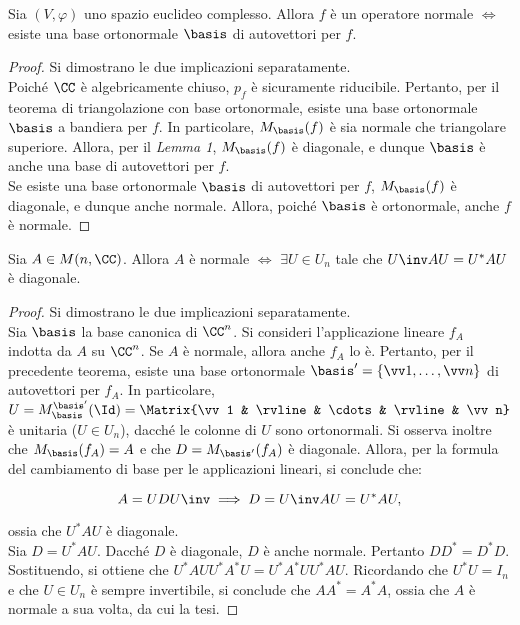 \begin{theorem}
	Sia $(V, \varphi)$ uno spazio euclideo complesso. Allora $f$ è un operatore normale $\iff$ esiste
	una base ortonormale $\basis$ di autovettori per $f$.
\end{theorem}

\begin{proof} Si dimostrano le due implicazioni separatamente. \\
	
	\rightproof Poiché $\CC$ è algebricamente chiuso, $p_f$ è sicuramente riducibile. Pertanto,
	per il teorema di triangolazione con base ortonormale, esiste una base ortonormale $\basis$
	a bandiera per $f$. In particolare, $M_\basis(f)$ è sia normale che triangolare superiore.
	Allora, per il \textit{Lemma 1}, $M_\basis(f)$ è diagonale, e dunque $\basis$ è anche una
	base di autovettori per $f$. \\
	
	\leftproof Se esiste una base ortonormale $\basis$ di autovettori per $f$, $M_\basis(f)$ è
	diagonale, e dunque anche normale. Allora, poiché $\basis$ è ortonormale, anche $f$
	è normale.
\end{proof}

\begin{corollary}
	Sia $A \in M(n, \CC)$. Allora $A$ è normale $\iff$ $\exists U \in U_n$ tale che $U\inv A U = U^* A U$
	è diagonale.
\end{corollary}

\begin{proof} Si dimostrano le due implicazioni separatamente. \\
	
	\rightproof Sia $\basis$ la base canonica di $\CC^n$.
	Si consideri l'applicazione lineare $f_A$ indotta da $A$ su $\CC^n$. Se $A$ è normale, allora
	anche $f_A$ lo è. Pertanto, per il precedente teorema, esiste una base ortonormale $\basis' = \{ \vv 1, \ldots, \vv n \}$ di
	autovettori per $f_A$. In particolare, $U = M_{\basis}^{\basis'}(\Id) = \Matrix{\vv 1 & \rvline & \cdots & \rvline & \vv n}$ è unitaria ($U \in U_n$), dacché le colonne di $U$ sono ortonormali. Si osserva inoltre che
	$M_{\basis}(f_A) = A$ e che $D = M_{\basis'}(f_A)$ è diagonale. Allora, per la formula del cambiamento di base per le applicazioni lineari,
	si conclude che:
	
	\[ A = U D U\inv \implies D = U\inv A U = U^* A U, \]
	
	ossia che $U^* A U$ è diagonale. \\
	
	\leftproof Sia $D = U^* A U$. Dacché $D$ è diagonale, $D$ è anche normale. Pertanto $D D^* = D^* D$.
	Sostituendo, si ottiene che $U^* A U U^* A^* U = U^* A^* U U^* A U$. Ricordando che $U^* U = I_n$ e
	che $U \in U_n$ è sempre invertibile, si conclude che $A A^* = A^* A$, ossia che $A$ è normale a
	sua volta, da cui la tesi. 
\end{proof}

